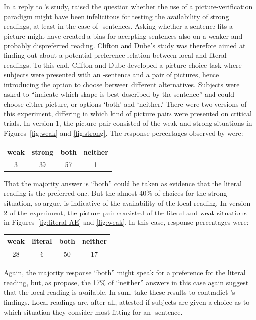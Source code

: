 \documentclass[fleqn,reqno,10pt]{article}
\newcommand{\as}{\acro{as}}
\begin{document}
In a reply to \citeauthor{GeurtsPouscoulous2009:Embedded-Implic}'s
study, \citet{CliftonDube2010:Embedded-Implic} raised the question
whether the use of a picture-verification paradigm might have been
infelicitous for testing the availability of strong readings, at least
in the case of \as-sentences. Asking whether a sentence fits a picture
might have created a bias for accepting sentences also on a weaker and
probably dispreferred reading. Clifton and Dube's study was therefore
aimed at finding out about a potential preference relation between
local and literal readings. To this end, Clifton and Dube developed a
picture-choice task where subjects were presented with an \as-sentence
and a pair of pictures, hence introducing the option to choose between
different alternatives. Subjects were asked to ``indicate which shape
is best described by the sentence'' and could choose either picture,
or options `both' and `neither.' There were two versions of this
experiment, differing in which kind of picture pairs were presented on
critical trials. In version 1, the picture pair consisted of the weak
and strong situations in Figures~\ref{fig:weak} and
\ref{fig:strong}. The response percentages observed by
\citeauthor{CliftonDube2010:Embedded-Implic} were:

\begin{center}
  \begin{tabular}{cccc}
    weak & strong & both & neither
    \\ \midrule 
 3 & 39 & 57 & 1 
  \end{tabular}
\end{center}

\noindent That the majority answer is ``both'' could be taken as
evidence that the literal reading is the preferred one. But the almost
40\% of choices for the strong situation, so
\citeauthor{CliftonDube2010:Embedded-Implic} argue, is indicative of
the availability of the local reading. In version 2 of the experiment,
the picture pair consisted of the literal and weak situations in
Figures~\ref{fig:literal-AE} and \ref{fig:weak}. In this case,
response percentages were:

\begin{center}
  \begin{tabular}{cccc}
    weak & literal & both & neither
    \\ \midrule 
    28 & 6 & 50 & 17 
  \end{tabular}
\end{center}

\noindent Again, the majority response ``both'' might speak for a
preference for the literal reading, but, as
\citeauthor{CliftonDube2010:Embedded-Implic} propose, the 17\% of
``neither'' answers in this case again suggest that the local reading
is available. In sum,
\citeauthor{CliftonDube2010:Embedded-Implic} take these results to
contradict \citeauthor{GeurtsPouscoulous2009:Embedded-Implic}'s
findings. Local readings are, after all, attested if subjects are
given a choice as to which situation they consider most fitting for an
\as-sentence.
\end{document}
